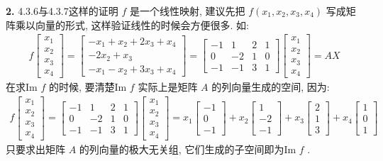 \documentclass[11pt,a4paper,openany,oneside]{book}
\begin{document}
\textbf{2.} 4.3.6与4.3.7这样的证明 $ f $ 是一个线性映射, 建议先把 $ f(x_1, x_2, x_3, x_4) $ 写成矩阵乘以向量的形式, 这样验证线性的时候会方便很多. 如:
\begin{gather*}
f
\begin{bmatrix}
x_1 \\ x_2 \\ x_3 \\ x_4
\end{bmatrix}
=
\begin{bmatrix}
-x_1 + x_2 + 2x_3 + x_4 \\ 
-2x_2 + x_3 \\
-x_1 -x_2 + 3x_3 + x_4
\end{bmatrix}
=
\begin{bmatrix}
-1 & 1 & 2 & 1 \\
0  & -2 & 1 & 0 \\
-1 & -1 & 3 & 1 
\end{bmatrix}
\begin{bmatrix}
x_1 \\ x_2 \\ x_3 \\ x_4
\end{bmatrix}
=AX
\end{gather*}
在求Im $ f $ 的时候, 要清楚Im $ f $ 实际上是矩阵 $ A $ 的列向量生成的空间, 因为:
\begin{gather*}
f
\begin{bmatrix}
x_1  \\  x_2  \\  x_3  \\ x_4
\end{bmatrix}=
\begin{bmatrix}
-1 & 1 & 2 & 1 \\
0  & -2 & 1 & 0 \\
-1 & -1 & 3 & 1 
\end{bmatrix}
\begin{bmatrix}
x_1  \\  x_2  \\  x_3  \\ x_4
\end{bmatrix}=x_1
\begin{bmatrix}
-1  \\  0  \\ -1  
\end{bmatrix}+x_2
\begin{bmatrix}
1  \\  -2  \\  -1 
\end{bmatrix}+x_3 
\begin{bmatrix}
2  \\  1  \\  3  
\end{bmatrix}+x_4
\begin{bmatrix}
1  \\  0  \\  1
\end{bmatrix}
\end{gather*}
只要求出矩阵 $ A $ 的列向量的极大无关组, 它们生成的子空间即为Im $ f $ .
\end{document}
